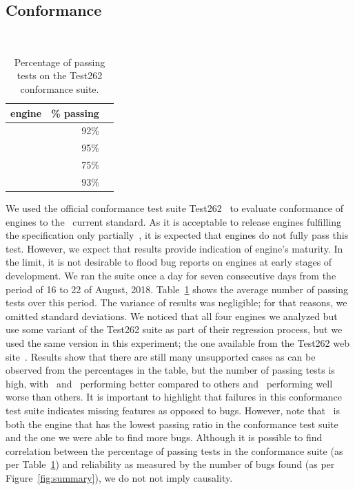 \documentclass[10pt,conference,anonymous]{IEEEtran}
\begin{document}
\subsection{Conformance}
\label{sec:stability}

\
\begin{table}[t]
  \centering
  \caption{\label{tab:test262}Percentage of passing tests on
    the Test262 conformance suite.}
  \small
  \begin{tabular}{crr}
    \toprule
    engine & \% passing \\
    \midrule
    \jsc{} & 92\%\\
    \veight{} & 95\% \\
    \chakra{} & 75\% \\    
    \smonkey{} & 93\% \\
    \bottomrule
  \end{tabular}
  \normalsize
\end{table}
    
We used the official conformance test suite
Test262~\cite{ecma262-conformance-suite} to evaluate conformance of
engines to the \js\ current standard. As it is acceptable to release
engines fulfilling the specification only partially~\cite{kangax}, it
is expected that engines do not fully pass this test. However, we
expect that results provide indication of engine's maturity. In the
limit, it is not desirable to flood bug reports on engines at early
stages of development. We ran the suite once a day for seven
consecutive days from the period of 16 to 22 of August,
2018. Table~\ref{tab:test262} shows the average number of passing
tests over this period. The variance of results was negligible; for
that reasons, we omitted standard deviations. We noticed that all four
engines we analyzed but \chakra{} use some variant of the Test262
suite as part of their regression process, but we used the same
version in this experiment; the one available from the Test262 web
site~\cite{ecma262-conformance-suite}. Results show that there are
still many unsupported cases as can be observed from the percentages
in the table, but the number of passing tests is high, with
\veight\ and \smonkey\ performing better compared to others and
\chakra\ performing well worse than others. It is important to
highlight that failures in this conformance test suite indicates
missing features as opposed to bugs. However, note that \chakra\ is
both the engine that has the lowest passing ratio in the conformance
test suite and the one we were able to find more bugs. Although it is
possible to find correlation between the percentage of passing tests
in the conformance suite (as per Table~\ref{tab:test262}) and reliability as
measured by the number of bugs found (as per
Figure~\ref{fig:summary}), we do not not imply causality.
\end{document}
